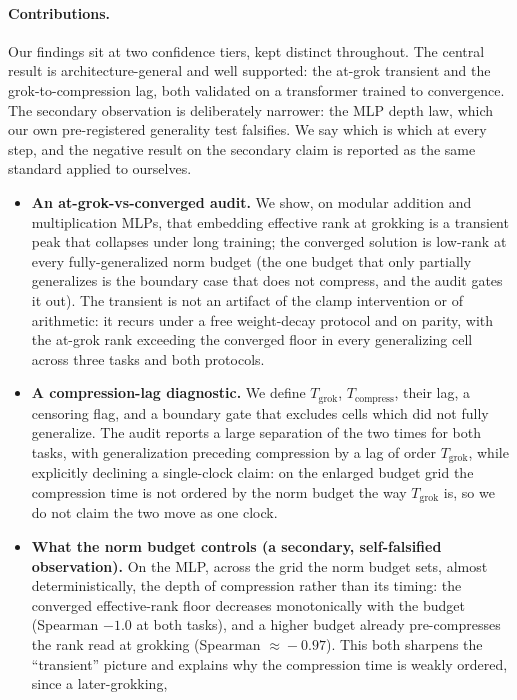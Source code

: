 \documentclass[11pt]{article}
\begin{document}
\paragraph{Contributions.} Our findings sit at two confidence tiers, kept distinct throughout. The central result is
architecture-general and well supported: the at-grok transient and the grok-to-compression lag, both
validated on a transformer trained to convergence. The secondary observation is deliberately narrower:
the MLP depth law, which our own pre-registered generality test falsifies. We say which is which at every
step, and the negative result on the secondary claim is reported as the same standard applied to
ourselves.
\begin{itemize}
\item \textbf{An at-grok-vs-converged audit.} We show, on modular addition and multiplication MLPs,
that embedding effective rank at grokking is a transient peak that collapses under long training; the
converged solution is low-rank at every fully-generalized norm budget (the one budget that only
partially generalizes is the boundary case that does not compress, and the audit gates it out). The
transient is not an artifact of the clamp intervention or of arithmetic: it recurs under a free
weight-decay protocol and on parity, with the at-grok rank exceeding the converged floor in every
generalizing cell across three tasks and both protocols.
\item \textbf{A compression-lag diagnostic.} We define $T_{\mathrm{grok}}$, $T_{\mathrm{compress}}$,
their lag, a censoring flag, and a boundary gate that excludes cells which did not fully generalize.
The audit reports a large separation of the two times for both tasks, with generalization preceding
compression by a lag of order $T_{\mathrm{grok}}$, while explicitly declining a single-clock claim:
on the enlarged budget grid the compression time is not ordered by the norm budget the way
$T_{\mathrm{grok}}$ is, so we do not claim the two move as one clock.
\item \textbf{What the norm budget controls (a secondary, self-falsified observation).} On the MLP,
across the grid the norm budget sets, almost
deterministically, the depth of compression rather than its timing: the converged effective-rank
floor decreases monotonically with the budget (Spearman $-1.0$ at both tasks), and a higher budget
already pre-compresses the rank read at grokking (Spearman $\approx\!-0.97$). This both sharpens the
``transient'' picture and explains why the compression time is weakly ordered, since a later-grokking,

\end{itemize}
\end{document}
